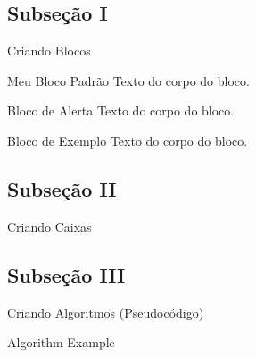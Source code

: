 \documentclass{libs/ufc_format}
\begin{document}
\subsection{Subseção I}
\begin{frame}{Criando Blocos}
    \begin{block}{Meu Bloco Padrão}
        Texto do corpo do bloco.
    \end{block}

    \begin{alertblock}{Bloco de Alerta}
        Texto do corpo do bloco.
    \end{alertblock}

    \begin{exampleblock}{Bloco de Exemplo}
        Texto do corpo do bloco.
    \end{exampleblock}   
\end{frame}

\subsection{Subseção II}
\begin{frame}{Criando Caixas}

    \pause


    \pause

\end{frame}

\subsection{Subseção III}
\begin{frame}{Criando Algoritmos (Pseudocódigo)}
    \begin{algorithm}[H]
        \SetAlgoLined
        \LinesNumbered
         \caption{Algorithm Example}
    \end{algorithm}
\end{frame}
\end{document}
